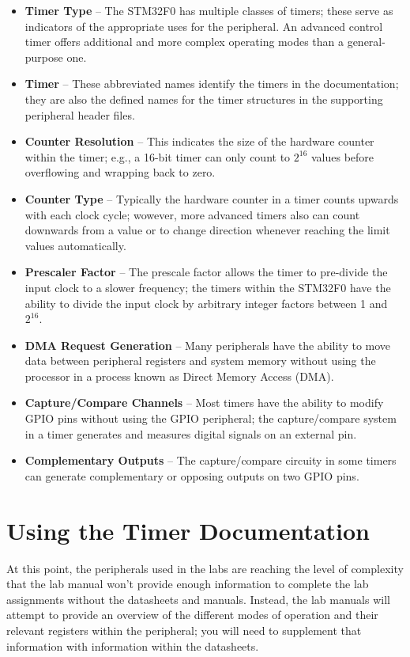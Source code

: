 \documentclass[openany,11pt,fleqn]{book} %
\begin{document}
        \begin{itemize}
            \item \textbf{Timer Type} -- The STM32F0 has multiple classes of timers; these serve as indicators of the appropriate uses for the peripheral. An advanced control timer offers additional and more complex operating modes than a general-purpose one. 
            \item \textbf{Timer} -- These abbreviated names identify the timers in the documentation; they are also the defined names for the timer structures in the supporting peripheral header files. 
            \item \textbf{Counter Resolution} -- This indicates the size of the hardware counter within the timer; e.g., a 16-bit timer can only count to $2^{16}$ values before overflowing and wrapping back to zero. 
            \item \textbf{Counter Type} -- Typically the hardware counter in a timer counts upwards with each clock cycle; wowever, more advanced timers also can count downwards from a value or to change direction whenever reaching the limit values automatically. 
            \item \textbf{Prescaler Factor} -- The prescale factor allows the timer to pre-divide the input clock to a slower frequency; the timers within the STM32F0 have the ability to divide the input clock by arbitrary integer factors between 1 and $2^{16}$.
            \item \textbf{DMA Request Generation} -- Many peripherals have the ability to move data between peripheral registers and system memory without using the processor in a process known as Direct Memory Access (DMA).
            \item \textbf{Capture/Compare Channels} -- Most timers have the ability to modify GPIO pins without using the GPIO peripheral; the capture/compare system in a timer generates and measures digital signals on an external pin. 
            \item \textbf{Complementary Outputs} -- The capture/compare circuity in some timers can generate complementary or opposing outputs on two GPIO pins. 
        \end{itemize}

\section{Using the Timer Documentation}
    At this point, the peripherals used in the labs are reaching the level of complexity that the lab manual won't provide enough information to complete the lab assignments without the datasheets and manuals. Instead, the lab manuals will attempt to provide an overview of the different modes of operation and their relevant registers within the peripheral; you will need to supplement that information with information within the datasheets.
\end{document}
